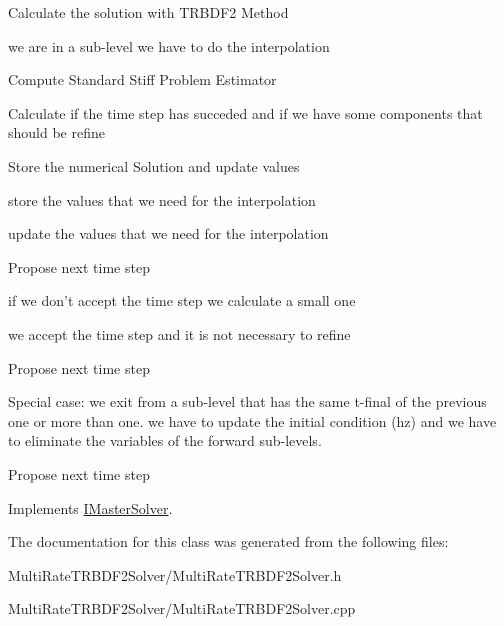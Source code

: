 Calculate the solution with TRBDF2 Method

we are in a sub-\/level we have to do the interpolation

Compute Standard Stiff Problem Estimator

Calculate if the time step has succeded and if we have some components that should be refine

Store the numerical Solution and update values

store the values that we need for the interpolation

update the values that we need for the interpolation

Propose next time step

if we don't accept the time step we calculate a small one

we accept the time step and it is not necessary to refine

Propose next time step

Special case: we exit from a sub-\/level that has the same t-\/final of the previous one or more than one. we have to update the initial condition (hz) and we have to eliminate the variables of the forward sub-\/levels.

Propose next time step 

Implements \hyperlink{classIMasterSolver}{IMasterSolver}.

The documentation for this class was generated from the following files:\begin{DoxyCompactItemize}
\item 
MultiRateTRBDF2Solver/MultiRateTRBDF2Solver.h\item 
MultiRateTRBDF2Solver/MultiRateTRBDF2Solver.cpp\end{DoxyCompactItemize}
